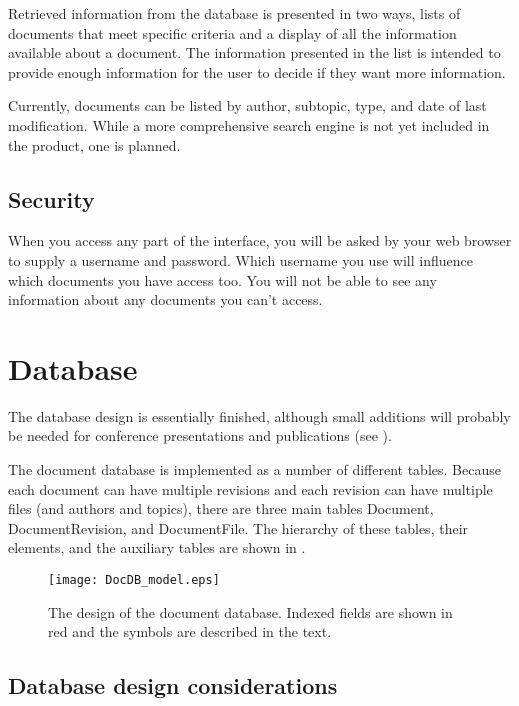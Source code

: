 \documentclass[12pt]{article}
\begin{document}
Retrieved information from the database is presented in two ways, lists of
documents that meet specific criteria and a display of all the information
available about a document. The information presented in the list is intended to
provide enough information for the user to decide if they want more information.

Currently, documents can be listed by author, subtopic, type, and date of last
modification.  While a more comprehensive search engine is not yet included in the
product, one is planned.

\subsection{Security}

When you access any part of the interface, you will be asked by your web browser
to supply a username and password. Which username you use will influence which
documents you have access too. You will not be able to see any information about
any documents you can't access.

\section{Database}

The database design is essentially finished, although small additions will
probably be needed for conference presentations and publications (see
).

The document 
database is implemented as a number of different tables. Because each 
document can have multiple revisions and each revision can have 
multiple files (and authors and topics), there are three main tables 
Document, DocumentRevision, and DocumentFile. The hierarchy of these 
tables, their elements, and the auxiliary tables are shown in
.

\begin{figure}
\begin{center}
\texttt{[image: DocDB\_model.eps]}
\caption{The design of the document database. Indexed fields are shown in red and the
symbols are described in the text.}
\end{center}
\end{figure}

\subsection{Database design considerations}
\end{document}
